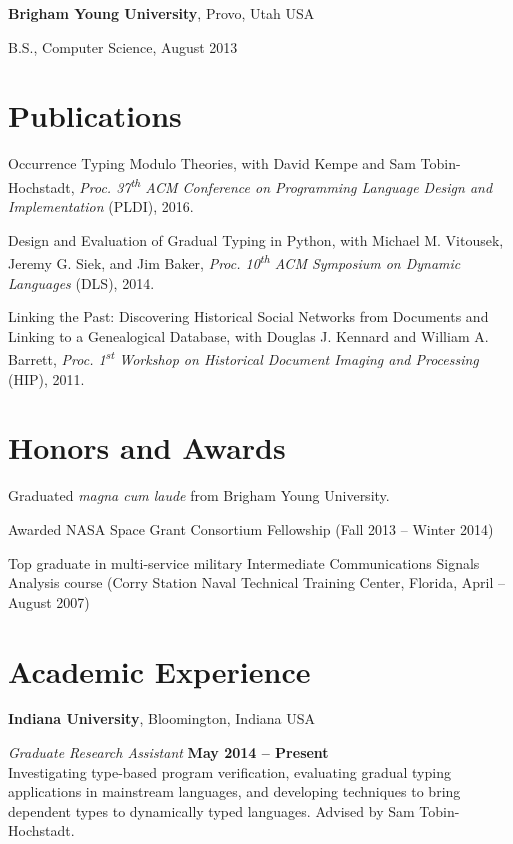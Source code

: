 \documentclass[margin,line]{res}
\newcommand{\ts}{\textsuperscript}
\newenvironment{list1}{
  \begin{list}{\ding{113}}{%
      \setlength{\itemsep}{0in}
      \setlength{\parsep}{0in} \setlength{\parskip}{0in}
      \setlength{\topsep}{0in} \setlength{\partopsep}{0in} 
      \setlength{\leftmargin}{0.17in}}}{\end{list}}
\begin{document}
\begin{resume}
{\bf Brigham Young University}, Provo, Utah USA\\
\vspace*{-.1in}
\begin{list1}
\item[] B.S., Computer Science, August 2013
\end{list1}

\section{\sc Publications}

Occurrence Typing Modulo Theories, with David Kempe and Sam
Tobin-Hochstadt, {\em Proc. 37\ts{th} ACM Conference on Programming 
Language Design and Implementation} (PLDI), 2016.

Design and Evaluation of Gradual Typing in Python, with Michael
M. Vitousek, Jeremy G. Siek, and Jim Baker, {\em Proc.  10\ts{th} ACM
  Symposium on Dynamic Languages} (DLS), 2014.

Linking the Past: Discovering Historical Social Networks from
Documents and Linking to a Genealogical Database, with Douglas
J. Kennard and William A. Barrett, {\em Proc. 1\ts{st} Workshop on
  Historical Document Imaging and Processing} (HIP), 2011.

\section{\sc Honors and Awards} 
Graduated \emph{magna cum laude} from Brigham Young University.

Awarded NASA Space Grant Consortium Fellowship (Fall 2013 -- Winter
2014)

Top graduate in multi-service military Intermediate Communications
Signals Analysis course (Corry Station Naval Technical Training
Center, Florida, April -- August 2007)

%

\section{\sc Academic Experience}
{\bf Indiana University}, Bloomington, Indiana USA

\vspace{-.3cm}
{\em Graduate Research Assistant} \hfill {\bf May 2014 -- Present}\\
Investigating type-based program verification, evaluating gradual
typing applications in mainstream languages, and developing techniques
to bring dependent types to dynamically typed languages. Advised by
Sam Tobin-Hochstadt.


\end{resume}
\end{document}
